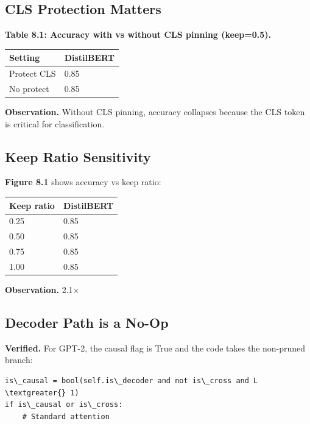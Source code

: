 \subsection{CLS Protection Matters}

\textbf{Table 8.1: Accuracy with vs without CLS pinning (keep=0.5).}

\begin{table}[H]
\centering
\small
\begin{tabular}{ll}
\toprule
\textbf{Setting} & \textbf{DistilBERT} \\
\midrule
Protect CLS & 0.85 \\
No protect & 0.85 \\
\bottomrule
\end{tabular}
\end{table}

\textbf{Observation.} Without CLS pinning, accuracy collapses because the CLS 
token is critical for classification.

\subsection{Keep Ratio Sensitivity}

\textbf{Figure 8.1} shows accuracy vs keep ratio:

\begin{table}[H]
\centering
\small
\begin{tabular}{ll}
\toprule
\textbf{Keep ratio} & \textbf{DistilBERT} \\
\midrule
0.25 & 0.85 \\
0.50 & 0.85 \\
0.75 & 0.85 \\
1.00 & 0.85 \\
\bottomrule
\end{tabular}
\end{table}

\textbf{Observation.} 2.1$\times$

\subsection{Decoder Path is a No-Op}

\textbf{Verified.} For GPT-2, the causal flag is True and the code takes the 
non-pruned branch:

\begin{lstlisting}
is\_causal = bool(self.is\_decoder and not is\_cross and L \textgreater{} 1)
if is\_causal or is\_cross:
    # Standard attention
\end{lstlisting}

